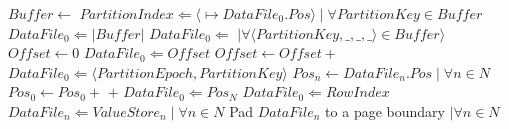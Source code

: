 \documentclass[fleqn]{article}
\begin{document}
\begin{algorithm}
\begin{algorithmic}[1]
   \State $Buffer \gets $ 
 \EndIf
\EndFor
\State {}
\EndProcedure
\Statex
{}
   \State $PartitionIndex \Leftarrow \langle $$ \mapsto DataFile_{0}.Pos \rangle \mid \forall PartitionKey \in Buffer$
   \State $DataFile_{0} \Leftarrow \lvert Buffer \rvert$
   \State $DataFile_{0} \Leftarrow $  $ \mid \forall \langle PartitionKey, \_,\_,\_\rangle \in Buffer \rangle$
   \State $Offset \gets 0$
     \State $DataFile_0 \Leftarrow Offset$
     \State $Offset \gets Offset + $ 
   \EndFor
    \State $DataFile_{0} \Leftarrow \langle PartitionEpoch, PartitionKey \rangle$
    \State $Pos_{n} \gets DataFile_{n}.Pos \mid \forall n \in N$
    \State $Pos_{0} \gets Pos_0 + $  $ + $ 
    \State $DataFile_{0} \Leftarrow Pos_{N}$
    \State $DataFile_{0} \Leftarrow RowIndex$
    \State $DataFile_{n} \Leftarrow ValueStore_{n} \mid \forall n \in N$
    \State Pad $DataFile_{n}$ to a page boundary $\mid \forall n \in N$
   \EndFor
\EndProcedure
\end{algorithmic}
\end{algorithm}
\end{document}
